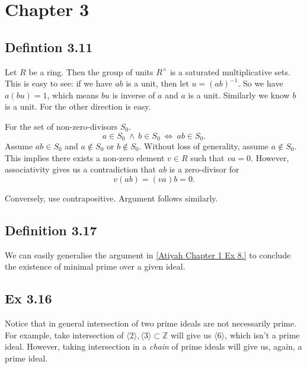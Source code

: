 \section{Chapter 3}

\subsection{Defintion 3.11}

Let $R$ be a ring. Then the group of units $R^{\times}$ is a saturated multiplicative sets. This is easy to see: if we have $ab$ is a unit, then let $u=(ab)^{-1}$. So we have $a(bu)=1$, which means $bu$ is inverse of $a$ and $a$ is a unit. Similarly we know $b$ is a unit. For the other direction is easy.

For the set of non-zero-divisors $S_0$. 
\[a\in S_0 ~\land~ b\in S_0 ~\Leftrightarrow~ ab\in S_0.\]
Assume $ab\in S_0$ and $a\notin S_0$ or $b\notin S_0$. Without loss of generality, assume $a\notin S_0$. This implies there exists a non-zero element $v\in R$ such that $va=0$. However, associativity gives us a contradiction that $ab$ is a zero-divisor for \[v(ab)=(va)b=0.\]

Conversely, use contrapositive. Argument follows similarly.


\subsection{Definition 3.17}

We can easily generalise the argument in \ref{Atiyah Chapter 1 Ex 8.} to conclude the existence of minimal prime over a given ideal.

\subsection{Ex 3.16}
Notice that in general intersection of two prime ideals are not necessarily prime. For example, take intersection of $\langle 2\rangle,\langle 3\rangle\subset \mathbb Z$ will give us $\langle 6\rangle$, which isn't a prime ideal. However, taking intersection in a \textit{chain} of prime ideals will give us, again, a prime ideal. 